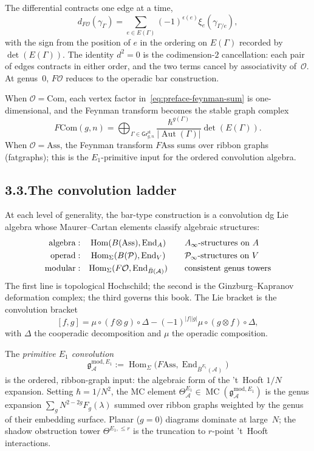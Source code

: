 \documentclass[11pt]{report}
\theoremstyle{definition}
\theoremstyle{remark}
\providecommand{\cA}{\mathcal{A}}
\providecommand{\cO}{\mathcal{O}}
\providecommand{\cP}{\mathcal{P}}
\providecommand{\barB}{\bar{B}}
\providecommand{\Ass}{\mathrm{Ass}}
\providecommand{\Com}{\mathrm{Com}}
\DeclareMathOperator{\End}{End}
\DeclareMathOperator{\Hom}{Hom}
\numberwithin{equation}{section}
\begin{document}
The differential contracts one edge at a time,
\[
d_{F\cO}(\gamma_\Gamma)=\sum_{e\in E(\Gamma)}(-1)^{\epsilon(e)}\xi_e(\gamma_{\Gamma/e}),
\]
with the sign from the position of $e$ in the ordering on $E(\Gamma)$
recorded by $\det(E(\Gamma))$. The identity $d^2=0$ is the
codimension-$2$ cancellation: each pair of edges contracts in either
order, and the two terms cancel by associativity of~$\cO$. At
genus~$0$, $F\cO$ reduces to the operadic bar construction.

When $\cO=\Com$, each vertex factor in~\eqref{eq:preface-feynman-sum}
is one-dimensional, and the Feynman transform becomes the stable
graph complex
\[
F\Com(g,n)=\bigoplus_{\Gamma\in\mathsf{Gr}^{\mathrm{st}}_{g,n}}\frac{\hbar^{g(\Gamma)}}{|\operatorname{Aut}(\Gamma)|}\det(E(\Gamma)).
\]
When $\cO=\Ass$, the Feynman transform $F\!\Ass$ sums over ribbon
graphs (fatgraphs); this is the $E_1$-primitive input for the ordered
convolution algebra.

\subsection*{3.3.\enspace The convolution ladder}

At each level of generality, the bar-type construction is a
convolution dg Lie algebra whose Maurer--Cartan elements classify
algebraic structures:
\begin{equation}\label{eq:preface-convolution-ladder}
\begin{array}{r@{\;:\quad}c@{\qquad}l}
\text{algebra} & \Hom(B(\Ass),\End_A) & A_\infty\text{-structures on }A\\[3pt]
\text{operad} & \Hom_\Sigma(B(\cP),\End_V) & \cP_\infty\text{-structures on }V\\[3pt]
\text{modular} & \Hom_\Sigma(F\cO,\End_{\barB(\cA)}) & \text{consistent genus towers}
\end{array}
\end{equation}
The first line is topological Hochschild; the second is the Ginzburg--Kapranov
deformation complex; the third governs this book. The Lie bracket is
the convolution bracket
\[
[f,g]=\mu\circ(f\otimes g)\circ\Delta-(-1)^{|f||g|}\mu\circ(g\otimes f)\circ\Delta,
\]
with $\Delta$ the cooperadic decomposition and $\mu$ the operadic
composition.

The \emph{primitive $E_1$ convolution}
\[
\mathfrak g^{\mathrm{mod},E_1}_\cA:=\Hom_\Sigma\bigl(F\!\Ass,\End_{\barB^{E_1}(\cA)}\bigr)
\]
is the ordered, ribbon-graph input: the algebraic form of the 't~Hooft
$1/N$ expansion. Setting $\hbar=1/N^2$, the MC element
$\Theta^{E_1}_\cA\in\operatorname{MC}(\mathfrak g^{\mathrm{mod},E_1}_\cA)$
is the genus expansion $\sum_g N^{2-2g}F_g(\lambda)$ summed over
ribbon graphs weighted by the genus of their embedding surface.
Planar ($g=0$) diagrams dominate at large~$N$; the shadow obstruction
tower $\Theta^{E_1,\le r}$ is the truncation to $r$-point 't~Hooft
interactions.
\end{document}
